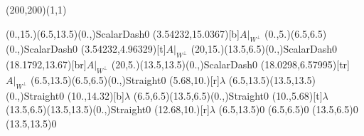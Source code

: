 \unitlength=1bp%

\begin{feynartspicture}(200,200)(1,1)

\FADiagram{}
\FAProp(0.,15.)(6.5,13.5)(0.,){ScalarDash}{0}
\FALabel(3.54232,15.0367)[b]{$A|_{W^\perp}$}
\FAProp(0.,5.)(6.5,6.5)(0.,){ScalarDash}{0}
\FALabel(3.54232,4.96329)[t]{$A|_{W^\perp}$}
\FAProp(20,15.)(13.5,6.5)(0.,){ScalarDash}{0}
\FALabel(18.1792,13.67)[br]{$A|_{W^\perp}$}
\FAProp(20,5.)(13.5,13.5)(0.,){ScalarDash}{0}
\FALabel(18.0298,6.57995)[tr]{$A|_{W^\perp}$}
\FAProp(6.5,13.5)(6.5,6.5)(0.,){Straight}{0}
\FALabel(5.68,10.)[r]{$\lambda$}
\FAProp(6.5,13.5)(13.5,13.5)(0.,){Straight}{0}
\FALabel(10.,14.32)[b]{$\lambda$}
\FAProp(6.5,6.5)(13.5,6.5)(0.,){Straight}{0}
\FALabel(10.,5.68)[t]{$\lambda$}
\FAProp(13.5,6.5)(13.5,13.5)(0.,){Straight}{0}
\FALabel(12.68,10.)[r]{$\lambda$}
\FAVert(6.5,13.5){0}
\FAVert(6.5,6.5){0}
\FAVert(13.5,6.5){0}
\FAVert(13.5,13.5){0}
\end{feynartspicture}

